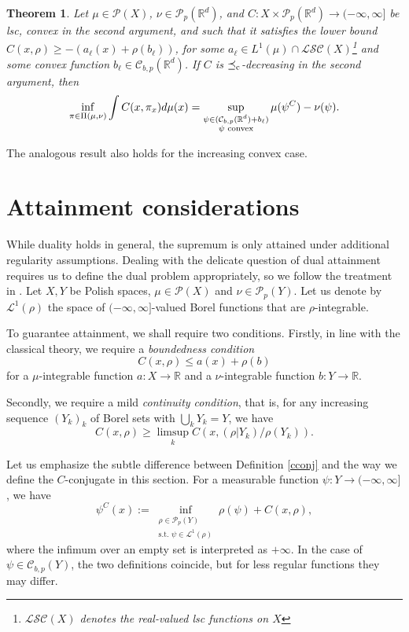 \documentclass[reqno, a4paper]{amsart}
\newcommand{\lc}{\preceq_{\textnormal{c}}}
\newtheorem{theorem}{Theorem}[section]
\newcommand{\PP}{\mathcal{P}}
\newcommand{\cP}{\mathcal{P}}
\renewcommand{\P}{\cP}
\newcommand{\R}{\mathbb R}
\theoremstyle{definition}
\theoremstyle{definition}
\theoremstyle{definition}
\newcommand{\LSC}{\mathcal{LSC}}
\begin{document}
\begin{theorem} \label{thmmod1}
   Let $\mu\in\PP(X)$, $\nu \in \PP_p(\R^d)$, and $C:X\times\PP_p(\R^d)\to(-\infty,\infty]$ be lsc, convex in the second argument, and such that it satisfies the lower bound $C(x,\rho)\geq-(a_\ell(x)+\rho(b_\ell))$, for some $a_\ell\in L^1(\mu)\cap \LSC(X)$\footnote{$\LSC(X)$ denotes the real-valued lsc functions on $X$} and some convex function $b_\ell\in{\mathcal{C}}_{b,p}(\R^d)$. If $C$ is $\lc$-decreasing in the second argument, then 
    \begin{align*} 
		\inf_{\pi\in\Pi(\mu,\nu)} \int C(x,\pi_x)d\mu(x)= \sup_{\substack{{\psi \in ({\mathcal{C}}_{b,p}(\R^d)+b_\ell)}\\ \psi \textnormal{ convex}}} \mu(\psi^C) - \nu(\psi).
	\end{align*}
\end{theorem}
The analogous result also holds for the increasing convex case.

\section{Attainment considerations}
\label{sec att}
While duality holds in general, the supremum is only attained under additional regularity assumptions.  Dealing with the delicate question of dual attainment requires us to define the dual problem appropriately, so we follow the treatment in \cite{BePaRiSc25}. Let $X,Y$ be Polish spaces, $\mu\in\P(X)$ and $\nu\in\PP_p(Y)$. Let us denote by $\mathcal L^1(\rho)$ the space of $(-\infty,\infty]$-valued Borel functions that are $\rho$-integrable. 

 

To guarantee attainment, we shall require two conditions. Firstly, in line with the classical theory, we require a \textit{boundedness condition}
\begin{equation*}
    \label{condB} \tag{B}
    C(x,\rho)\leq a(x)+\rho(b)
\end{equation*}
for a $\mu$-integrable function $a:X\to\R$ and a $\nu$-integrable function $b:Y\to\R$.

Secondly, we require a mild \textit{continuity condition}, that is, for any increasing sequence $(Y_k)_k$ of Borel sets with $\bigcup_kY_k=Y$, we have 
\begin{equation*}
    \label{condC} \tag{C}
    C(x,\rho)\geq \limsup_k C(x,(\rho|Y_k)/\rho(Y_k)).
\end{equation*}

Let us emphasize the subtle difference between Definition \ref{cconj} and the way we define the $C$-conjugate in this section. For a measurable function $\psi:Y\to(-\infty,\infty]$, we have
$$\psi^C(x):=\inf_{\substack{\rho\in\PP_p(Y)\\ \text{s.t. }\psi\in\mathcal L ^1(\rho)} } \rho(\psi)+C(x,\rho),$$
where the infimum over an empty set is interpreted as $+\infty$. In the case of $\psi\in{\mathcal{C}}_{b,p}(Y)$, the two definitions coincide, but for less regular functions they may differ.
\end{document}
